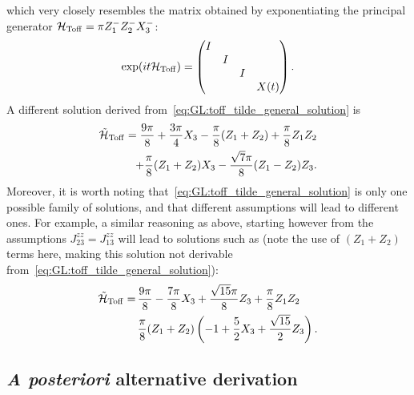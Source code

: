 which very closely resembles the matrix obtained by exponentiating the principal generator
$\mathcal H_{\operatorname{Toff}} = \pi Z_1^- Z_2^- X_3^-$:
\begin{equation}
	\exp(i t \mathcal H_{\operatorname{Toff}}) =
	\begin{pmatrix}
		I & & & \\
		& I & & \\
		& & I & \\
		& & & X(t)
	\end{pmatrix}.
\end{equation}
A different solution derived from~\cref{eq:GL:toff_tilde_general_solution} is
\begin{equation}
\begin{aligned}
	\tilde{\mathcal H}_{\operatorname{Toff}} =
	\frac{9\pi}{8} + \frac{3\pi}{4} X_3 - \frac{\pi}{8} (Z_1 + Z_2)
	+ \frac{\pi}{8} Z_1 Z_2 \\
	+ \frac{\pi}{8} (Z_1 + Z_2) X_3
	- \frac{\sqrt7 \pi}{8} (Z_1 - Z_2) Z_3.
\end{aligned}
\end{equation}
Moreover, it is worth noting that~\cref{eq:GL:toff_tilde_general_solution} is only one possible family of solutions, and that different assumptions will lead to different ones.
For example, a similar reasoning as above, starting however from the assumptions $J_{23}^{zz}=J_{13}^{zz}$ will lead to solutions such as (note the use of $(Z_1+Z_2)$ terms here, making this solution not derivable from~\cref{eq:GL:toff_tilde_general_solution}):
\begin{equation}
\begin{aligned}
	\tilde{{\mathcal{H}}}_{\operatorname{Toff}}{} =\,
		&\frac{9\pi}{8} - \frac{7\pi}{8}X_3 + \frac{\sqrt{15}\pi}{8} Z_3 + \frac{\pi}{8}Z_1 Z_2 \\
		&\frac{\pi}{8}(Z_1+Z_2)\left(-1+\frac{5}{2}X_3 + \frac{\sqrt{15}}{2}Z_3\right).
\end{aligned}
\end{equation}

\subsection{\textit{A posteriori} alternative derivation}
\label{subsec:GL:toffoli_posteriori_derivation}

